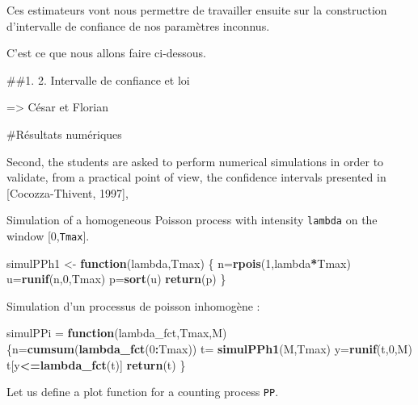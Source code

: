 \documentclass[
]{article}
\newenvironment{Shaded}{\begin{snugshade}}{\end{snugshade}}
\newcommand{\ControlFlowTok}[1]{\textcolor[rgb]{0.13,0.29,0.53}{\textbf{#1}}}
\newcommand{\DecValTok}[1]{\textcolor[rgb]{0.00,0.00,0.81}{#1}}
\newcommand{\FunctionTok}[1]{\textcolor[rgb]{0.13,0.29,0.53}{\textbf{#1}}}
\newcommand{\NormalTok}[1]{#1}
\newcommand{\OtherTok}[1]{\textcolor[rgb]{0.56,0.35,0.01}{#1}}
\newcommand{\SpecialCharTok}[1]{\textcolor[rgb]{0.81,0.36,0.00}{\textbf{#1}}}
\begin{document}
Ces estimateurs vont nous permettre de travailler ensuite sur la
construction d'intervalle de confiance de nos paramètres inconnus.

C'est ce que nous allons faire ci-dessous.

\#\#1. 2. Intervalle de confiance et loi

=\textgreater{} César et Florian

\#Résultats numériques

Second, the students are asked to perform numerical simulations in order
to validate, from a practical point of view, the confidence intervals
presented in {[}Cocozza-Thivent, 1997{]},

Simulation of a homogeneous Poisson process with intensity
\texttt{lambda} on the window {[}0,\texttt{Tmax}{]}.

\begin{Shaded}
\begin{Highlighting}[]
\NormalTok{simulPPh1 }\OtherTok{\textless{}{-}} \ControlFlowTok{function}\NormalTok{(lambda,Tmax)}
\NormalTok{\{ n}\OtherTok{=}\FunctionTok{rpois}\NormalTok{(}\DecValTok{1}\NormalTok{,lambda}\SpecialCharTok{*}\NormalTok{Tmax)}
\NormalTok{  u}\OtherTok{=}\FunctionTok{runif}\NormalTok{(n,}\DecValTok{0}\NormalTok{,Tmax)}
\NormalTok{  p}\OtherTok{=}\FunctionTok{sort}\NormalTok{(u)}
  \FunctionTok{return}\NormalTok{(p)}
\NormalTok{\}}
\end{Highlighting}
\end{Shaded}

Simulation d'un processus de poisson inhomogène :

\begin{Shaded}
\begin{Highlighting}[]
\NormalTok{simulPPi }\OtherTok{=} \ControlFlowTok{function}\NormalTok{(lambda\_fct,Tmax,M)}
\NormalTok{\{n}\OtherTok{=}\FunctionTok{cumsum}\NormalTok{(}\FunctionTok{lambda\_fct}\NormalTok{(}\DecValTok{0}\SpecialCharTok{:}\NormalTok{Tmax))}
\NormalTok{  t}\OtherTok{=} \FunctionTok{simulPPh1}\NormalTok{(M,Tmax)}
\NormalTok{  y}\OtherTok{=}\FunctionTok{runif}\NormalTok{(t,}\DecValTok{0}\NormalTok{,M)}
\NormalTok{  t[y}\SpecialCharTok{\textless{}=}\FunctionTok{lambda\_fct}\NormalTok{(t)]}
  \FunctionTok{return}\NormalTok{(t)}
\NormalTok{\}}
\end{Highlighting}
\end{Shaded}

Let us define a plot function for a counting process \texttt{PP}.
\end{document}
